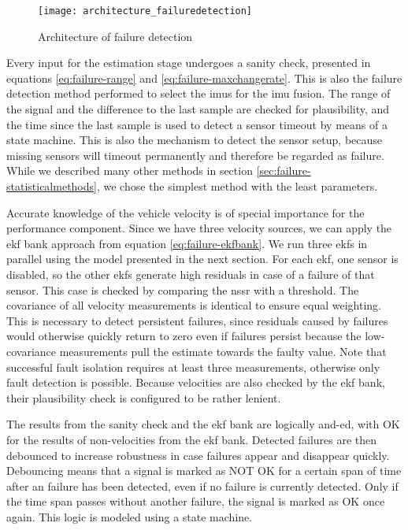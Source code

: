 \begin{figure}
	\centering
	\texttt{[image: architecture\_failuredetection]}%
	\caption{Architecture of failure detection}
	\label{fig:architecture-failuredetection}
\end{figure}

Every input for the estimation stage undergoes a sanity check, presented in equations \ref{eq:failure-range} and \ref{eq:failure-maxchangerate}. This is also the failure detection method performed to select the \glspl{imu} for the \gls{imu} fusion. The range of the signal and the difference to the last sample are checked for plausibility, and the time since the last sample is used to detect a sensor timeout by means of a state machine. This is also the mechanism to detect the sensor setup, because missing sensors will timeout permanently and therefore be regarded as failure. While we described many other methods in section \ref{sec:failure-statisticalmethods}, we chose the simplest method with the least parameters.

Accurate knowledge of the vehicle velocity is of special importance for the performance component. Since we have three velocity sources, we can apply the \gls{ekf} bank approach from equation \ref{eq:failure-ekfbank}. We run three \glspl{ekf} in parallel using the model presented in the next section. For each \gls{ekf}, one sensor is disabled, so the other \glspl{ekf} generate high residuals in case of a failure of that sensor. This case is checked by comparing the \gls{nssr} with a threshold. The covariance of all velocity measurements is identical to ensure equal weighting. This is necessary to detect persistent failures, since residuals caused by failures would otherwise quickly return to zero even if failures persist because the low-covariance measurements pull the estimate towards the faulty value. Note that successful fault isolation requires at least three measurements, otherwise only fault detection is possible. Because velocities are also checked by the \gls{ekf} bank, their plausibility check is configured to be rather lenient.

The results from the sanity check and the \gls{ekf} bank are logically and-ed, with OK for the results of non-velocities from the \gls{ekf} bank. Detected failures are then debounced to increase robustness in case failures appear and disappear quickly. Debouncing means that a signal is marked as NOT OK for a certain span of time after an failure has been detected, even if no failure is currently detected. Only if the time span passes without another failure, the signal is marked as OK once again. This logic is modeled using a state machine.

